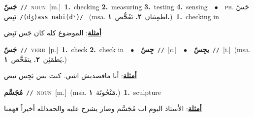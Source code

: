 \documentclass[10pt,a4paper,twoside]{article} %
\begin{document}
\begin{multicols}{2}
{\setlength\topsep{0pt}\textbf{\foreignlanguage{arabic}{جَسّ}}\ {\color{gray}\texttt{//}\color{black}}\ \textsc{noun}\ [m.]\ \textbf{1.}~checking  \textbf{2.}~measuring  \textbf{3.}~testing  \textbf{4.}~sensing\ \ $\bullet$\ \ \textsc{ph.} \color{gray} \foreignlanguage{arabic}{جَسّ نَبِض}\color{black}\ {\color{gray}\texttt{/{\sffamily (dʒ)ass nabi(dˤ)}/}\color{black}}\ \color{gray} (msa. \foreignlanguage{arabic}{اطمِئنان}~\foreignlanguage{arabic}{\textbf{٢.}}  \foreignlanguage{arabic}{تَفَحُّص}~\foreignlanguage{arabic}{\textbf{١.}})\color{black}\ \textbf{1.}~checking in\  \begin{flushright}\color{gray}\foreignlanguage{arabic}{\textbf{\underline{\foreignlanguage{arabic}{أمثلة}}}: الموضوع كله كان جَس نَبِض}\end{flushright}\color{black}} \vspace{2mm}

{\setlength\topsep{0pt}\textbf{\foreignlanguage{arabic}{جَسّ}}\ {\color{gray}\texttt{//}\color{black}}\ \textsc{verb}\ [p.]\ \textbf{1.}~check  \textbf{2.}~check in\ \ $\bullet$\ \ \setlength\topsep{0pt}\textbf{\foreignlanguage{arabic}{جِسّ}}\ {\color{gray}\texttt{//}\color{black}}\ [c.]\ \ $\bullet$\ \ \setlength\topsep{0pt}\textbf{\foreignlanguage{arabic}{يجِسّ}}\ {\color{gray}\texttt{//}\color{black}}\ [i.]\ \color{gray}(msa. \foreignlanguage{arabic}{يَطمَئِن}~\foreignlanguage{arabic}{\textbf{٢.}}  \foreignlanguage{arabic}{يتفَحَّص}~\foreignlanguage{arabic}{\textbf{١.}})\color{black}\  \begin{flushright}\color{gray}\foreignlanguage{arabic}{\textbf{\underline{\foreignlanguage{arabic}{أمثلة}}}: أنا ماقصديش اشي. كنت بس بَجِس نبض}\end{flushright}\color{black}} \vspace{2mm}

{\setlength\topsep{0pt}\textbf{\foreignlanguage{arabic}{مُجَسَّم}}\ {\color{gray}\texttt{//}\color{black}}\ \textsc{noun}\ [m.]\ \color{gray}(msa. \foreignlanguage{arabic}{مَنْحُوتَة}~\foreignlanguage{arabic}{\textbf{١.}})\color{black}\ \textbf{1.}~sculpture\  \begin{flushright}\color{gray}\foreignlanguage{arabic}{\textbf{\underline{\foreignlanguage{arabic}{أمثلة}}}: الأستاذ اليوم اب مُجَسَّم وصار يشرح عليه والحمدلله أخيراً فهمنا}\end{flushright}\color{black}} \vspace{2mm}


\end{multicols}
\end{document}
